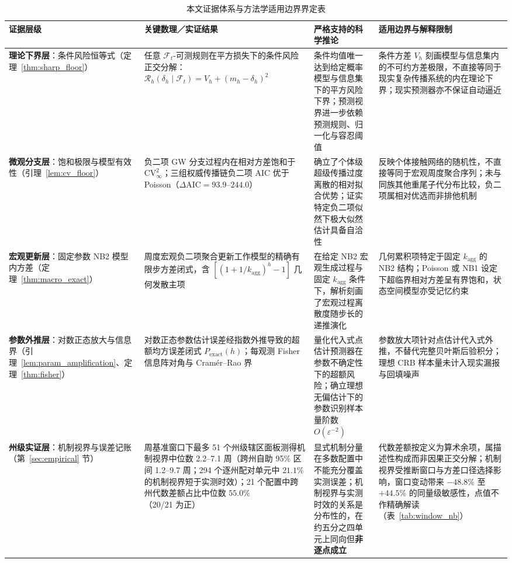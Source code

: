 \documentclass[10pt,UTF8,a4paper,zihao=-4]{ctexart}
\theoremstyle{plain}
\theoremstyle{definition}
\theoremstyle{remark}
\begin{document}
\begin{table}[htbp]
\centering
\footnotesize
\setlength{\tabcolsep}{3.5pt}
\renewcommand{\arraystretch}{1.08}
\caption{本文证据体系与方法学适用边界界定表}
\label{tab:claim_hierarchy}
\begin{tabular}{@{}>{\raggedright\arraybackslash}p{2.45cm}>{\raggedright\arraybackslash}p{4.3cm}>{\raggedright\arraybackslash}p{4.1cm}>{\raggedright\arraybackslash}p{4.45cm}@{}}
\toprule
证据层级 & 关键数理／实证结果 & 严格支持的科学推论 & 适用边界与解释限制 \\
\midrule
\textbf{理论下界层}：条件风险恒等式（定理~\ref{thm:sharp_floor}） & 任意 $\mathcal{F}_t$-可测规则在平方损失下的条件风险正交分解：$\mathcal{R}_h(\delta_h\mid\mathcal{F}_t) = V_h + (m_h - \delta_h)^2$ & 条件均值唯一达到给定概率模型与信息集下的平方风险下界；预测视界进一步依赖预测规则、归一化与容忍阈值 & 条件方差 $V_h$ 刻画模型与信息集内的不可约方差极限，不直接等同于现实复杂传播系统的内在理论下界；现实预测器亦不保证自动逼近 \\
\addlinespace[2pt]
\textbf{微观分支层}：饱和极限与模型有效性（引理~\ref{lem:cv_floor}） & 负二项 GW 分支过程内在相对方差饱和于 $\text{CV}^2_\infty$；三组权威传播链负二项 AIC 优于 Poisson（$\Delta\text{AIC} = 93.9\text{--}244.0$） & 确立了个体级超级传播过度离散的相对拟合优势；证实特定负二项似然下极大似然估计具备自洽性 & 反映个体接触网络的随机性，不直接等同于宏观周度聚合序列；未与同族其他重尾子代分布比较，负二项属相对优选而非排他机制 \\
\addlinespace[2pt]
\textbf{宏观更新层}：固定参数 NB2 模型内方差（定理~\ref{thm:macro_exact}） & 周度宏观负二项聚合更新工作模型的精确有限步方差闭式，含 $[(1+1/k_{\text{agg}})^h - 1]$ 几何发散主项 & 在给定 NB2 宏观生成过程与固定 $k_{\text{agg}}$ 条件下，解析刻画了宏观过程离散度随步长的递推演化 & 几何累积项特定于固定 $k_{\text{agg}}$ 的 NB2 结构；Poisson 或 NB1 设定下超临界相对方差呈有界饱和，状态空间模型亦受记忆约束 \\
\addlinespace[2pt]
\textbf{参数外推层}：对数正态放大与信息界（引理~\ref{lem:param_amplification}、定理~\ref{thm:fisher}） & 对数正态参数估计误差经指数外推导致的超额均方误差闭式 $P_{\text{exact}}(h)$；每观测 Fisher 信息阵对角与 Cram\'er--Rao 界 & 量化代入式点估计预测器在参数不确定性下的超额风险；确立理想无偏估计下的参数识别样本量阶数 $O(\varepsilon^{-2})$ & 参数放大项针对点估计代入式外推，不替代完整贝叶斯后验积分；理想 CRB 样本量未计入现实漏报与回填噪声 \\
\addlinespace[2pt]
\textbf{州级实证层}：机制视界与误差记账（第~\ref{sec:empirical} 节） & 5 周基准窗口下最多 51 个州级辖区面板测得机制视界中位数 2.2--7.1 周（跨州自助 95\% 区间 1.2--9.7 周；294 个逐州配对单元中 $21.1\%$ 的机制视界短于实测时效）；21 个配置中跨州代数差额占比中位数 $55.0\%$（20/21 为正） & 显式机制分量在多数配置中不能充分覆盖实测误差；机制视界与实测时效的关系是分布性的，在约五分之四单元上同向但\textbf{非逐点成立} & 代数差额按定义为算术余项，属描述性构成而非因果正交分解；机制视界受推断窗口与方差口径选择影响，窗口变动带来 $-48.8\%$ 至 $+44.5\%$ 的同量级敏感性，点值不作精确解读（表~\ref{tab:window_nb}） \\

\end{tabular}
\end{table}
\end{document}
